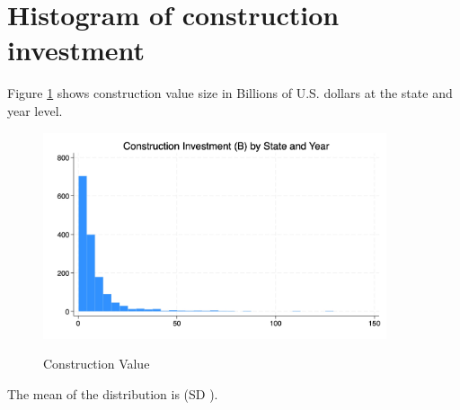\documentclass[12pt]{article}
\begin{document}
\section{Histogram of construction investment}
Figure \ref{fig:hist1} shows construction value size in Billions of U.S. dollars at the state and year level.
\vspace*{\baselineskip}

\begin{figure}[hp]
    \centering
    \caption{Construction Value} 
    \includegraphics[width=0.9\textwidth]{histinv.jpg}
    \label{fig:hist1}
\end{figure}
    \begin{center} \vspace*{-\baselineskip}
        \footnotesize {}
    \end{center}


The mean of the distribution is \MeanValue (SD \SD).
\end{document}
